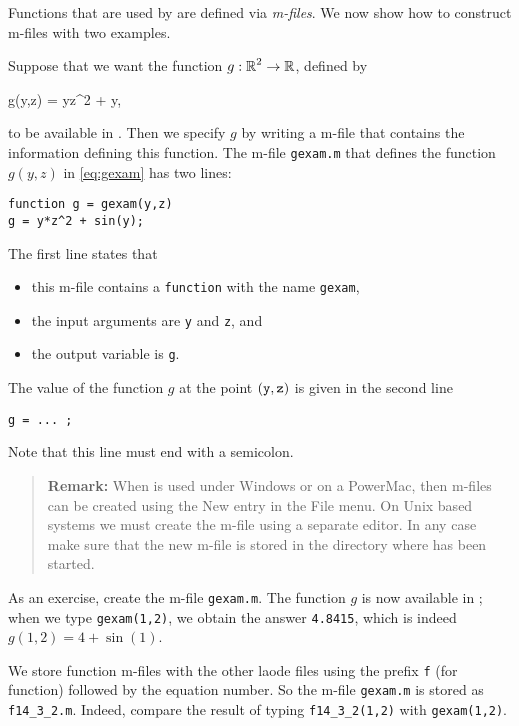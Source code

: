 \documentclass{ximera}
\begin{document}
Functions that are used by \Matlab are defined via 
{\em m-files}.  We now show how to construct m-files with two examples.

Suppose that we want the function $g:\mbox{$\Bbb{R}$}^2\to\mbox{$\Bbb{R}$}$, defined by
\begin{matlabEquation}  \label{eq:gexam}
g(y,z) = yz^2 + \sin y,
\end{matlabEquation}
to be available in \Matlabp.
Then we specify $g$ by writing a \Matlab m-file that contains the information 
defining this function.  The m-file {\tt gexam.m} that defines the function 
$g(y,z)$ in \eqref{eq:gexam} has two lines:
\begin{verbatim}
function g = gexam(y,z)
g = y*z^2 + sin(y);
\end{verbatim}
The first line states that 
\begin{itemize}
\item this m-file contains a {\tt function} with the name {\tt gexam},
\item the input arguments are {\tt y} and {\tt z}, and
\item the output variable is {\tt g}.
\end{itemize}
The value of the function $g$ at the point ${\tt (y,z)}$ is given in the 
second line 
\begin{verbatim}
g = ... ;   
\end{verbatim}
Note that this line must end with a semicolon. 
\begin{quote}
{\bf Remark:} When \Matlab is used under Windows or on a PowerMac, then 
m-files
can be created using the {\sf New} entry in the {\sf File} menu.
On Unix based systems we must create the m-file using a separate
editor.  In any case make sure that the new m-file is stored in the directory
where \Matlab has been started.
\end{quote}
As an exercise, create the m-file {\tt gexam.m}.  The function $g$ is 
now available in \Matlabp; when we type {\tt gexam(1,2)}, 
we obtain the answer \verb+4.8415+, which is indeed $g(1,2)=4+\sin(1)$.

We store function m-files with the other {\sf laode} files using the prefix
{\tt f} (for function) followed by the equation number.  So the m-file 
{\tt gexam.m} is stored as {\tt f14\_3\_2.m}.  Indeed, compare the result of 
typing {\tt f14\_3\_2(1,2)} with {\tt gexam(1,2)}.
\end{document}
